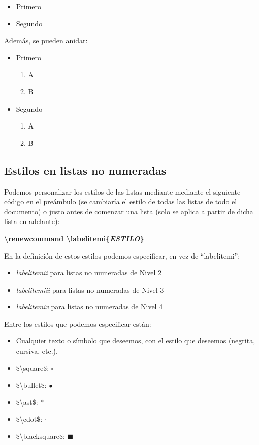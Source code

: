 \documentclass[12pt]{book} %
\begin{document}
\begin{itemize}
\item Primero
\item Segundo
\end{itemize}

Además, se pueden anidar:

\begin{itemize}
\item Primero
	\begin{enumerate}
	\item A
	\item B
	\end{enumerate}
\item Segundo
	\begin{enumerate}
	\item A
	\item B
	\end{enumerate}
\end{itemize}

\subsection{Estilos en listas no numeradas}

Podemos personalizar los estilos de las listas mediante mediante el siguiente código en el preámbulo (se cambiaría el estilo de todas las listas de todo el documento) o justo antes de comenzar una lista (solo se aplica a partir de dicha lista en adelante):

\textbf{\textbackslash renewcommand \textbackslash labelitemi\{\emph{ESTILO}\}}

En la definición de estos estilos podemos especificar, en vez de ``labelitemi'':

\begin{itemize}
	\item \emph{labelitemii} para listas no numeradas de Nivel 2
	\item \emph{labelitemiii} para listas no numeradas de Nivel 3
	\item\emph{labelitemiv} para listas no numeradas de Nivel 4
\end{itemize}

Entre los estilos que podemos especificar están:

\renewcommand\labelitemi{$\cdot$}
\begin{itemize}
	\item Cualquier texto o símbolo que deseemos, con el estilo que deseemos (negrita, cursiva, etc.).
	\item \$\textbackslash square\$: $\square$
	\item \$\textbackslash bullet\$: $\bullet$
	\item \$\textbackslash ast\$: $\ast$
	\item \$\textbackslash cdot\$: $\cdot$
	\item \$\textbackslash blacksquare\$: $\blacksquare$
\end{itemize}
\end{document}
